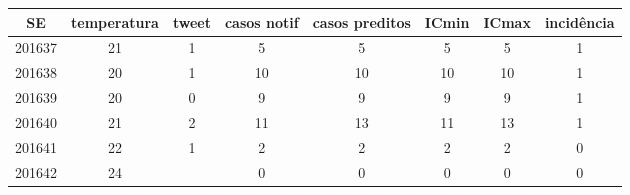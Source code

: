 \begin{tabular}{c|ccccccc}
  \hline
SE & temperatura & tweet & casos notif & casos preditos & ICmin & ICmax & incidência \\ 
  \hline
201637 & 21 & 1 & 5 & 5 & 5 & 5 & 1 \\ 
  201638 & 20 & 1 & 10 & 10 & 10 & 10 & 1 \\ 
  201639 & 20 & 0 & 9 & 9 & 9 & 9 & 1 \\ 
  201640 & 21 & 2 & 11 & 13 & 11 & 13 & 1 \\ 
  201641 & 22 & 1 & 2 & 2 & 2 & 2 & 0 \\ 
  201642 & 24 &  & 0 & 0 & 0 & 0 & 0 \\ 
   \hline
\end{tabular}
